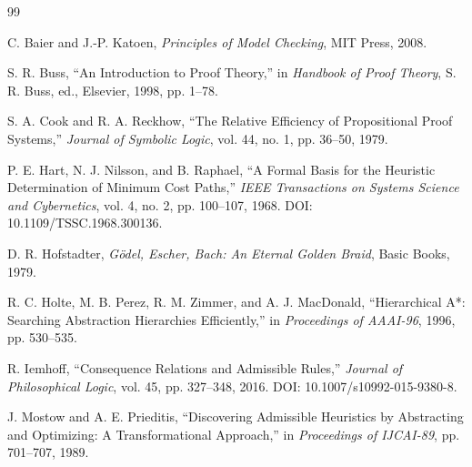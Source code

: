 \documentclass[11pt]{article}
\theoremstyle{definition}
\theoremstyle{remark}
\begin{document}
\begin{thebibliography}{99}

C. Baier and J.-P. Katoen,
\emph{Principles of Model Checking},
MIT Press, 2008.

S. R. Buss,
``An Introduction to Proof Theory,''
in \emph{Handbook of Proof Theory}, S. R. Buss, ed.,
Elsevier, 1998, pp. 1--78.

S. A. Cook and R. A. Reckhow,
``The Relative Efficiency of Propositional Proof Systems,''
\emph{Journal of Symbolic Logic}, vol. 44, no. 1, pp. 36--50, 1979.

P. E. Hart, N. J. Nilsson, and B. Raphael,
``A Formal Basis for the Heuristic Determination of Minimum Cost Paths,''
\emph{IEEE Transactions on Systems Science and Cybernetics}, vol. 4, no. 2, pp. 100--107, 1968.
DOI: 10.1109/TSSC.1968.300136.

D. R. Hofstadter,
\emph{G\"odel, Escher, Bach: An Eternal Golden Braid},
Basic Books, 1979.

R. C. Holte, M. B. Perez, R. M. Zimmer, and A. J. MacDonald,
``Hierarchical A*: Searching Abstraction Hierarchies Efficiently,''
in \emph{Proceedings of AAAI-96}, 1996, pp. 530--535.

R. Iemhoff,
``Consequence Relations and Admissible Rules,''
\emph{Journal of Philosophical Logic}, vol. 45, pp. 327--348, 2016.
DOI: 10.1007/s10992-015-9380-8.

J. Mostow and A. E. Prieditis,
``Discovering Admissible Heuristics by Abstracting and Optimizing: A Transformational Approach,''
in \emph{Proceedings of IJCAI-89}, pp. 701--707, 1989.

\end{thebibliography}
\end{document}
